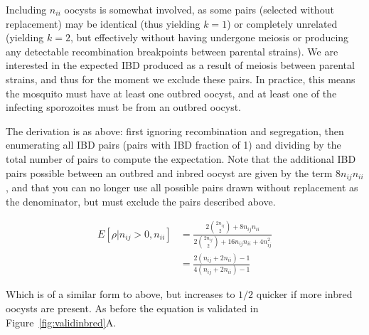 \documentclass[9pt]{article}
\begin{document}
Including $n_{ii}$ oocysts is somewhat involved, as some pairs (selected without replacement) may be identical (thus yielding $k=1$) or completely unrelated (yielding $k=2$, but effectively without having undergone meiosis or producing any detectable recombination breakpoints between parental strains).  We are interested in the expected IBD produced as a result of meiosis between parental strains, and thus for the moment we exclude these pairs. In practice, this means the mosquito must have at least one outbred oocyst, and at least one of the infecting sporozoites must be from an outbred oocyst.

The derivation is as above: first ignoring recombination and segregation, then enumerating all IBD pairs (pairs with IBD fraction of 1) and dividing by the total number of pairs to compute the expectation. Note that the additional IBD pairs possible between an outbred and inbred oocyst are given by the term $8n_{ij}n_{ii}$, and that you can no longer use all possible pairs drawn without replacement as the denominator, but must exclude the pairs described above.

\begin{align}
E[\rho|n_{ij} > 0, n_{ii}] & = \frac{2{2n_{ij} \choose 2} + 8n_{ij}n_{ii}}{2{2n_{ij} \choose 2} + 16n_{ij}n_{ii} + 4n_{ij}^2} \nonumber\\
& = \frac{2(n_{ij} + 2n_{ii}) - 1}{4(n_{ij} + 2n_{ii}) - 1}  \label{eq2}
\end{align}


Which is of a similar form to above, but increases to $1/2$ quicker if more inbred oocysts are present. As before the equation is validated in Figure~\ref{fig:validinbred}A.
\end{document}
